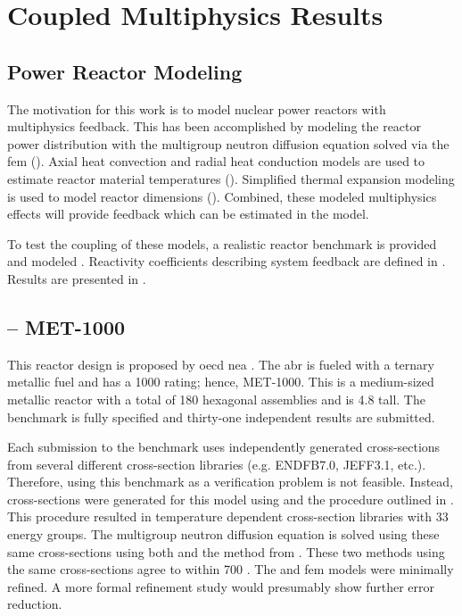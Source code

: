 \chapter{Coupled Multiphysics Results}
\label{ch:coupledResults}

\section{Power Reactor Modeling}
\label{sec:power_reactor_modeling}
  The motivation for this work is to model nuclear power reactors with
  multiphysics feedback. This has been accomplished by modeling the reactor 
  power distribution with the multigroup neutron diffusion equation solved via 
  the \gls{fem} (). Axial heat
  convection and radial heat conduction models are used to estimate reactor
  material temperatures ().
  Simplified thermal expansion modeling is used to model reactor dimensions 
  (). Combined, these modeled multiphysics effects 
  will provide feedback which can be estimated in the model. 
  
  To test the coupling of these models, a realistic reactor benchmark is 
  provided and modeled . Reactivity coefficients describing system 
  feedback are defined in . Results are 
  presented in .

\section{ -- MET-1000}
\label{sec:abr}
  This reactor design is proposed by \gls{oecd} \gls{nea} \cite{abr}. The 
  \gls{abr} is fueled with a ternary metallic fuel and has a 1000
   rating; hence, MET-1000. This is a medium-sized metallic reactor 
  with a total of 180 hexagonal assemblies and is 4.8  tall. The 
  benchmark is fully specified and thirty-one independent results are submitted. 
  
  Each submission to the benchmark uses independently generated cross-sections 
  from several different cross-section libraries (e.g. ENDFB7.0, JEFF3.1, etc.). 
  Therefore, using this benchmark as a verification problem is not feasible.
  Instead, cross-sections were generated for this model using \mcc and the
  procedure outlined in . This procedure 
  resulted in temperature dependent cross-section libraries with 33 energy 
  groups. The multigroup neutron diffusion equation is solved using these same
  cross-sections using both \dif and the method from 
  . These two methods using the same cross-sections 
  agree to within 700 . The \dif and \gls{fem} models were minimally 
  refined. A more formal refinement study would presumably show further error 
  reduction. 
  
